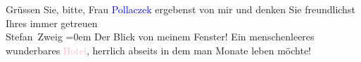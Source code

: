\pstart
           Grüssen Sie, bitte, Frau \textcolor{blue}{Pollaczek}{}\ledrightnote{\textcolor{blue}{Clara Katharina Pollaczek}}
               ergebenst von mir und denken Sie freundlichst Ihres immer getreuen{\\[\baselineskip]}\spacefill\mbox{Stefan Zweig}\pend
           \leftskip=0em{}
\pstart
           \noindent{}{\pb}Der Blick von meinem Fenster! Ein
                  menschenleeres wunderbares \textcolor{pink}{Hotel}{}\ledrightnote{{$\rightarrow$}\textcolor{pink}{Hôtel Byron}}, herrlich abseits in dem man Monate leben möchte!\pend
           \endnumbering{}
\begin{anhang}
\end{anhang}
      
